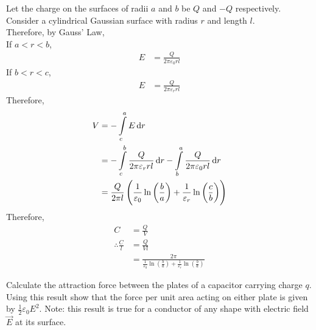 \documentclass[fleqn, a4paper, 11pt, oneside]{amsart}
\theoremstyle{definition}
\theoremstyle{theorem}
\begin{document}
\begin{solution}
	Let the charge on the surfaces of radii $a$ and $b$ be $Q$ and $-Q$ respectively.\\
	Consider a cylindrical Gaussian surface with radius $r$ and length $l$.\\
	Therefore, by Gauss' Law,\\
	If $a < r < b$,
	\begin{align*}
		E &= \frac{Q}{2 \pi \varepsilon_0 r l}
	\end{align*}
	If $b < r < c$,
	\begin{align*}
		E &= \frac{Q}{2 \pi \varepsilon_r r l}
	\end{align*}
	Therefore,
	\begin{align*}
		V &= -\int\limits_{c}^{a} E \dif r\\
		&= -\int\limits_{c}^{b} \frac{Q}{2 \pi \varepsilon_r r l} \dif r - \int\limits_{b}^{a} \frac{Q}{2 \pi \varepsilon_0 r l} \dif r\\
		&= \frac{Q}{2 \pi l} \left( \frac{1}{\varepsilon_0} \ln \left( \frac{b}{a} \right) + \frac{1}{\varepsilon_r} \ln \left( \frac{c}{b} \right) \right)
	\end{align*}
	Therefore,
	\begin{align*}
		C &= \frac{Q}{V}\\
		\therefore \frac{C}{l} &= \frac{Q}{V l}\\
		&= \frac{2 \pi }{\frac{1}{\varepsilon_0} \ln \left( \frac{b}{a} \right) + \frac{1}{\varepsilon_r} \ln \left( \frac{b}{a} \right)}
	\end{align*}
\end{solution}

\begin{question}
	Calculate the attraction force between the plates of a capacitor carrying charge $q$.
	Using this result show that the force per unit area acting on either plate is given by $\frac{1}{2} \varepsilon_0 E^2$.
	Note: this result is true for a conductor of any shape with electric field $\overrightarrow{E}$ at its surface.
\end{question}
\end{document}
